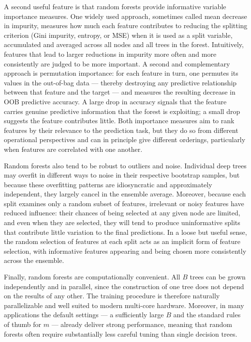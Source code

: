A second useful feature is that random forests provide informative \alert{variable importance measures}. One widely used approach, sometimes called mean decrease in impurity, measures how much each feature contributes to reducing the splitting criterion (Gini impurity, entropy, or MSE) when it is used as a split variable, accumulated and averaged across all nodes and all trees in the forest. Intuitively, features that lead to larger reductions in impurity more often and more consistently are judged to be more important. A second and complementary approach is permutation importance: for each feature in turn, one permutes its values in the out-of-bag data --- thereby destroying any predictive relationship between that feature and the target --- and measures the resulting decrease in OOB predictive accuracy. A large drop in accuracy signals that the feature carries genuine predictive information that the forest is exploiting; a small drop suggests the feature contributes little. Both importance measures aim to rank features by their relevance to the prediction task, but they do so from different operational perspectives and can in principle give different orderings, particularly when features are correlated with one another.

Random forests also tend to be \alert{robust to outliers and noise}. Individual deep trees may overfit in different ways to noise in their respective bootstrap samples, but because these overfitting patterns are idiosyncratic and approximately independent, they largely cancel in the ensemble average. Moreover, because each split examines only a random subset of features, irrelevant or noisy features have reduced influence: their chances of being selected at any given node are limited, and even when they are selected, they will tend to produce uninformative splits that contribute little variation to the final predictions. In a loose but useful sense, the random selection of features at each split acts as an implicit form of feature selection, with informative features appearing and being chosen more consistently across the ensemble.

Finally, random forests are computationally convenient. All $B$ trees can be grown independently and in parallel, since the construction of one tree does not depend on the results of any other. The training procedure is therefore naturally parallelizable and well suited to modern multi-core hardware. Moreover, in many applications the default settings --- a sufficiently large $B$ and the standard rules of thumb for $m$ --- already deliver strong performance, meaning that random forests often require substantially less careful tuning than single decision trees.

